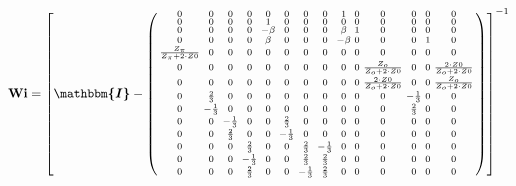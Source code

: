 \[ \mathbf{Wi} =  \left[ \boldsymbol{\mathbbm{I}}  -
\left(\begin{smallmatrix} 0 & 0 & 0 & 0 & 0 & 0 & 0 & 0 & 1 & 0 & 0 &
0 & 0 & 0 \\ 0 & 0 & 0 & 0 & 1 & 0 & 0 & 0 & 0 & 0 & 0 & 0 & 0 & 0 \\
0 & 0 & 0 & 0 & -\beta & 0 & 0 & 0 & \beta & 1 & 0 & 0 & 0 & 0 \\ 0 &
0 & 0 & 0 & \beta & 0 & 0 & 0 & -\beta & 0 & 0 & 0 & 1 & 0 \\
\frac{Z_{\pi}}{Z_{\pi}+2\cdot Z0} & 0 & 0 & 0 & 0 & 0 & 0 & 0 & 0 & 0
& 0 & 0 & 0 & 0 \\ 0 & 0 & 0 & 0 & 0 & 0 & 0 & 0 & 0 & 0 &
\frac{Z_o}{Z_o+2\cdot Z0} & 0 & 0 & \frac{2\cdot Z0}{Z_o+2\cdot Z0} \\
0 & 0 & 0 & 0 & 0 & 0 & 0 & 0 & 0 & 0 & \frac{2\cdot Z0}{Z_o+2\cdot
Z0} & 0 & 0 & \frac{Z_o}{Z_o+2\cdot Z0} \\ 0 & \frac{2}{3} & 0 & 0 & 0
& 0 & 0 & 0 & 0 & 0 & 0 & -\frac{1}{3} & 0 & 0 \\ 0 & -\frac{1}{3} & 0
& 0 & 0 & 0 & 0 & 0 & 0 & 0 & 0 & \frac{2}{3} & 0 & 0 \\ 0 & 0 &
-\frac{1}{3} & 0 & 0 & \frac{2}{3} & 0 & 0 & 0 & 0 & 0 & 0 & 0 & 0 \\
0 & 0 & \frac{2}{3} & 0 & 0 & -\frac{1}{3} & 0 & 0 & 0 & 0 & 0 & 0 & 0
& 0 \\ 0 & 0 & 0 & \frac{2}{3} & 0 & 0 & \frac{2}{3} & -\frac{1}{3} &
0 & 0 & 0 & 0 & 0 & 0 \\ 0 & 0 & 0 & -\frac{1}{3} & 0 & 0 &
\frac{2}{3} & \frac{2}{3} & 0 & 0 & 0 & 0 & 0 & 0 \\ 0 & 0 & 0 &
\frac{2}{3} & 0 & 0 & -\frac{1}{3} & \frac{2}{3} & 0 & 0 & 0 & 0 & 0 &
0 \end{smallmatrix}\right) \right]^{-1}  \]
